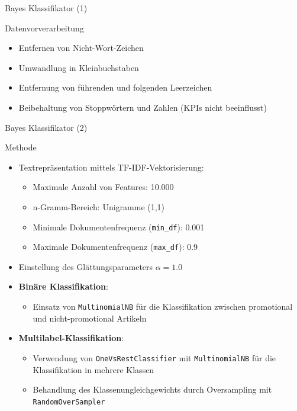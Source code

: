 \documentclass[aspectratio=169]{beamer} %
\begin{document}
\begin{frame}{Bayes Klassifikator (1)}
    \begin{block}{Datenvorverarbeitung}
        \begin{itemize}
            \item Entfernen von Nicht-Wort-Zeichen
            \item Umwandlung in Kleinbuchstaben
            \item Entfernung von f\"uhrenden und folgenden Leerzeichen
            \item Beibehaltung von Stoppw\"ortern und Zahlen (KPIs nicht beeinflusst)
        \end{itemize}
    \end{block}
\end{frame}
\begin{frame}{Bayes Klassifikator (2)}
    \begin{block}{Methode}
        \begin{itemize}
            \item Textrepr\"asentation mittels TF-IDF-Vektorisierung:
                  \begin{itemize}
                      \item Maximale Anzahl von Features: 10.000
                      \item n-Gramm-Bereich: Unigramme (1,1)
                      \item Minimale Dokumentenfrequenz (\texttt{min\_df}): 0.001
                      \item Maximale Dokumentenfrequenz (\texttt{max\_df}): 0.9
                  \end{itemize}
            \item Einstellung des Gl\"attungsparameters \(\alpha = 1.0\)
            \item \textbf{Bin\"are Klassifikation}:
                  \begin{itemize}
                      \item Einsatz von \texttt{MultinomialNB} f\"ur die Klassifikation zwischen promotional und nicht-promotional Artikeln
                  \end{itemize}
            \item \textbf{Multilabel-Klassifikation}:
                  \begin{itemize}
                      \item Verwendung von \texttt{OneVsRestClassifier} mit \texttt{MultinomialNB} f\"ur die Klassifikation in mehrere Klassen
                      \item Behandlung des Klassenungleichgewichts durch Oversampling mit \texttt{RandomOverSampler}
                  \end{itemize}
        \end{itemize}
    \end{block}
\end{frame}
\end{document}

